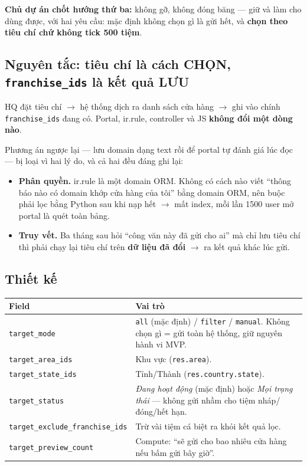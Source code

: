 \textbf{Chủ dự án chốt hướng thứ ba:} không gỡ, không đóng băng --- giữ và làm cho dùng được, với
hai yêu cầu: mặc định không chọn gì là gửi hết, và \textbf{chọn theo tiêu chí chứ không tick 500
tiệm}.

\subsection{Nguyên tắc: tiêu chí là cách CHỌN, \texttt{franchise\_ids} là kết quả LƯU}

HQ đặt tiêu chí $\to$ hệ thống dịch ra danh sách cửa hàng $\to$ ghi vào chính
\texttt{franchise\_ids} đang có. Portal, ir.rule, controller và JS \textbf{không đổi một dòng nào}.

Phương án ngược lại --- lưu domain dạng text rồi để portal tự đánh giá lúc đọc --- bị loại vì hai lý
do, và cả hai đều đáng ghi lại:

\begin{itemize}
  \item \textbf{Phân quyền.} ir.rule là một domain ORM. Không có cách nào viết ``thông báo nào có
    domain khớp cửa hàng của tôi'' bằng domain ORM, nên buộc phải lọc bằng Python sau khi nạp hết
    $\to$ mất index, mỗi lần 1500 user mở portal là quét toàn bảng.
  \item \textbf{Truy vết.} Ba tháng sau hỏi ``công văn này đã gửi cho ai'' mà chỉ lưu tiêu chí thì
    phải chạy lại tiêu chí trên \textbf{dữ liệu đã đổi} $\to$ ra kết quả khác lúc gửi.
\end{itemize}

\subsection{Thiết kế}

\begin{center}
\begin{tabular}{p{4.6cm}p{9.2cm}}
\hline
\textbf{Field} & \textbf{Vai trò} \\
\hline
\texttt{target\_mode} & \texttt{all} (mặc định) / \texttt{filter} / \texttt{manual}. Không chọn gì =
gửi toàn hệ thống, giữ nguyên hành vi MVP. \\
\texttt{target\_area\_ids} & Khu vực (\texttt{res.area}). \\
\texttt{target\_state\_ids} & Tỉnh/Thành (\texttt{res.country.state}). \\
\texttt{target\_status} & \emph{Đang hoạt động} (mặc định) hoặc \emph{Mọi trạng thái} --- không gửi
nhầm cho tiệm nháp/đóng/hết hạn. \\
\texttt{target\_exclude\_franchise\_ids} & Trừ vài tiệm cá biệt ra khỏi kết quả lọc. \\
\texttt{target\_preview\_count} & Compute: ``sẽ gửi cho bao nhiêu cửa hàng nếu bấm gửi bây giờ''. \\
\hline
\end{tabular}
\end{center}


